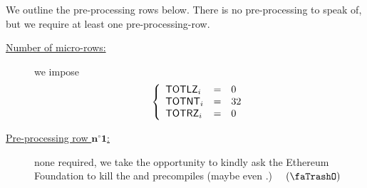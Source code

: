 \begin{center}
\end{center}
We outline the pre-processing rows below.
There is no pre-processing to speak of, but we require at least one pre-processing-row.
\begin{description}
	\item[\underline{Number of micro-rows:}]
		we impose
		\[
			\left\{ \begin{array}{lcl}
				\textsf{TOTLZ}    _{i}     & = & 0 \\ 
				\textsf{TOTNT}    _{i}     & = & 32 \\ 
				\textsf{TOTRZ}    _{i}     & = & 0 \\ 
			\end{array} \right.
		\]
	\item[\underline{Pre-processing row $\bm{n^\circ 1}$:}] 
		none required, we take the opportunity to kindly ask the Ethereum Foundation to kill the  and  precompiles \faSmileO{} (maybe even .) $\quad(\trash)$
\end{description}
